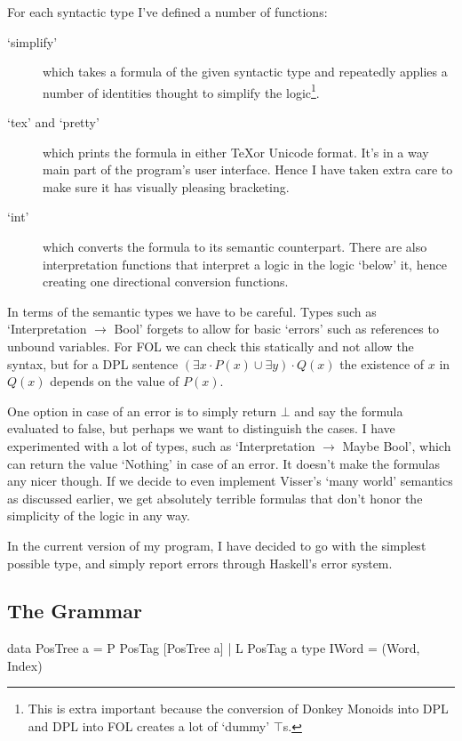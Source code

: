 \documentclass[12pt]{article}
\begin{document}
For each syntactic type I've defined a number of functions:
\begin{description}
\item[`simplify'] which takes a formula of the given syntactic type and repeatedly applies a number of identities thought to simplify the logic\footnote{This is extra important because the conversion of Donkey Monoids into DPL and DPL into FOL creates a lot of `dummy' $\top$s.}.
\item[`tex' and `pretty'] which prints the formula in either \TeX or Unicode format. It's in a way main part of the program's user interface. Hence I have taken extra care to make sure it has visually pleasing bracketing.
\item[`int'] which converts the formula to its semantic counterpart. There are also interpretation functions that interpret a logic in the logic `below' it, hence creating one directional conversion functions.
\end{description}

In terms of the semantic types we have to be careful. Types such as `Interpretation $\rightarrow$ Bool' forgets to allow for basic `errors' such as references to unbound variables. For FOL we can check this statically and not allow the syntax, but for a DPL sentence $(\exists x\cdot P(x) \cup \exists y)\cdot Q(x)$ the existence of $x$ in $Q(x)$ depends on the value of $P(x)$.

One option in case of an error is to simply return $\bot$ and say the formula evaluated to false, but perhaps we want to distinguish the cases. I have experimented with a lot of types, such as `Interpretation $\rightarrow$ Maybe Bool', which can return the value `Nothing' in case of an error. It doesn't make the formulas any nicer though. If we decide to even implement Visser's `many world' semantics as discussed earlier, we get absolutely terrible formulas that don't honor the simplicity of the logic in any way.

In the current version of my program, I have decided to go with the simplest possible type, and simply report errors through Haskell's error system.

\subsection{The Grammar}

\newsavebox{\LstBox}
\begin{lrbox}{\LstBox}
\begin{haskell}
data PosTree a = P PosTag [PosTree a] | L PosTag a
type IWord = (Word, Index)
\end{haskell}
\end{lrbox}
\end{document}
